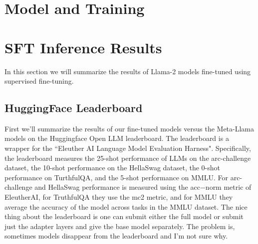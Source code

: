 \documentclass[11pt, oneside]{article}   	%
\begin{document}
\section{Model and Training}
\section{SFT Inference Results}
In this section we will summarize the results of Llama-2 models fine-tuned using supervised fine-tuning.

\subsection{HuggingFace Leaderboard}
First we'll summarize the results of our fine-tuned models versus the Meta-Llama models on the Huggingface Open LLM leaderboard.
The leaderboard is a wrapper for the ``Eleuther AI Language Model Evaluation Harness". 
Specifically, the leaderboard measures the 25-shot performance of LLMs on the arc-challenge dataset, the 10-shot performance on the HellaSwag dataset, the 0-shot performance on TurthfulQA, and the 5-shot performance on MMLU. For arc-challenge and HellaSwag performance is measured using the acc$-$norm metric of EleutherAI, for TruthfulQA they use the mc2 metric, and for MMLU they average the accuracy of the model across tasks in the MMLU dataset.
The nice thing about the leaderboard is one can submit either the full model or submit just the adapter layers and give the base model separately.
The problem is, sometimes models disappear from the leaderboard and I'm not sure why.
\end{document}
